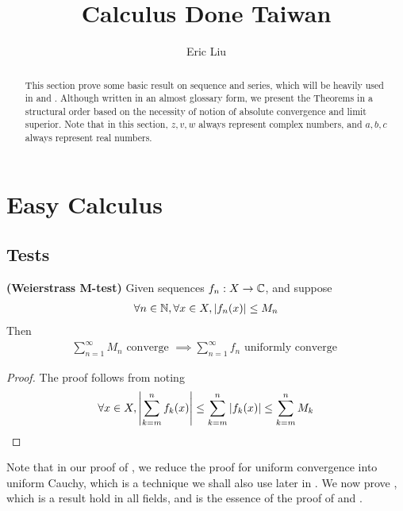 \documentclass{report}
\title{Calculus Done Taiwan}
\author{Eric Liu}
\date{}
\begin{document}
\maketitle
\newpage%

\tableofcontents
\pagebreak

\chapter{Easy Calculus}
\section{Tests}
\label{Basic Technique on Sequence and Series}
\begin{abstract}
This section prove some basic result on sequence and series, which will be heavily used in  and . Although written in an almost glossary form, we present the Theorems in a structural order based on the necessity of notion of absolute convergence and limit superior. Note that in this section, $z,v,w$ always represent complex numbers, and $a,b,c$ always represent real numbers.  
\end{abstract}
\begin{theorem}
\label{WM-t}
\textbf{(Weierstrass M-test)} Given sequences $f_n:X\rightarrow \mathbb{C}$, and suppose 
\begin{align*}
\forall n\in\mathbb{N},\forall x\in X, \left|f_n(x)\right|\leq M_n
\end{align*}
Then 
\begin{align*}
\sum_{n=1}^\infty M_n\text{ converge }\implies \sum_{n=1}^\infty f_n\text{ uniformly converge }
\end{align*} 
\end{theorem}
\begin{proof}
The proof follows from noting 
\begin{align*}
  \forall x\in X, \left|\sum_{k=m}^n f_k(x)\right|\leq \sum_{k=m}^n \left|f_k(x)\right|\leq \sum_{k=m}^n M_k
\end{align*}
\end{proof}
\begin{mdframed}
  Note that in our proof of  , we reduce the proof for uniform convergence into uniform Cauchy, which is a technique we shall also use later in . We now prove , which is a result hold in all fields, and is the essence of the proof of  and . 
\end{mdframed}
\end{document}
